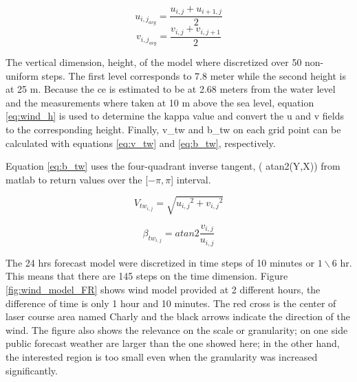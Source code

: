 \begin{equation} \label{eq:hor_AVG_velu}
    u_{{i,j}_{avg}}=\frac{ u_{i,j} + u_{{i+1},j} } {2}
\end{equation}
\begin{equation} \label{eq:hor_AVG_velv}
    v_{{i,j}_{avg}}=\frac{ v_{i,j} + v_{i,{j+1}} } {2}
\end{equation}

The vertical dimension, height, of the model where discretized over 50 non-uniform steps. The first level corresponds to 7.8 meter while the second height is at 25 m. Because the \acrshort{ce} is estimated to be at 2.68 meters from the water level \cite{pennanen2015optimal} and the measurements where taken at 10 m above the sea level, equation \ref{eq:wind_h} is used to determine the \acrshort{kappa} value and convert the \acrshort{u} and \acrshort{v} fields to the corresponding height. Finally, \acrshort{v_tw} and \acrshort{b_tw} on each grid point can be calculated with equations \ref{eq:v_tw} and \ref{eq:b_tw}, respectively. \par \noindent Equation \ref{eq:b_tw} uses the four-quadrant inverse tangent, ( atan2(Y,X)) from \acrshort{matlab} to return values over the [$- \pi, \pi  $] interval.%

\begin{equation}\label{eq:v_tw}
    V_{tw_{i,j}}=\sqrt{{u_{i,j}}^2+{v_{i,j}}^2}
\end{equation}

\begin{equation}\label{eq:b_tw}
    \beta_{tw_{i,j}}= atan2 \frac {v_{i,j}}{u_{i,j}}
\end{equation}

The 24 hrs forecast model were discretized in time steps of 10 minutes or ${1} \backslash {6}$ hr. This means that there are 145 steps on the time dimension. Figure \ref{fig:wind_model_FR} shows wind model provided at 2 different hours, the difference of time is only 1 hour and 10 minutes. The red cross is the center of laser course area named Charly and the black arrows indicate the direction of the wind. The figure also shows the relevance on the scale or granularity; on one side public forecast weather are larger than the one showed here; in the other hand, the interested region is too small even when the granularity was increased significantly. \par    

